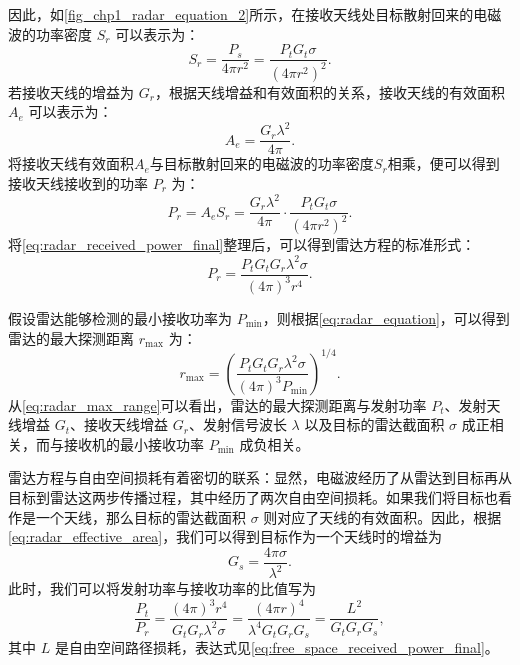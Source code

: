 因此，如\cref{fig_chp1_radar_equation_2}所示，在接收天线处目标散射回来的电磁波的功率密度 $S_r$ 可以表示为：
\begin{equation*}
    S_r = \frac{P_s}{4 \pi r^2} = \frac{P_t G_t \sigma}{(4 \pi r^2)^2}.
    \label{eq:radar_received_power_density}
\end{equation*}
若接收天线的增益为 $G_r$，根据天线增益和有效面积的关系，接收天线的有效面积 $A_e$ 可以表示为：
\begin{equation}
    A_e = \frac{G_r \lambda^2}{4 \pi}.
    \label{eq:radar_effective_area}
\end{equation}
将接收天线有效面积\( A_e \)与目标散射回来的电磁波的功率密度\( S_r \)相乘，便可以得到接收天线接收到的功率 $P_r$ 为：
\begin{equation}
    P_r = A_e S_r  = \frac{G_r \lambda^2}{4 \pi} \cdot \frac{P_t G_t \sigma}{(4 \pi r^2)^2}.
    \label{eq:radar_received_power_final}
\end{equation}
将\cref{eq:radar_received_power_final}整理后，可以得到雷达方程的标准形式：
\begin{equation}
    P_r = \frac{P_t G_t G_r \lambda^2 \sigma}{(4 \pi)^3 r^4}.
    \label{eq:radar_equation}
\end{equation}

假设雷达能够检测的最小接收功率为 $P_{\text{min}}$，则根据\cref{eq:radar_equation}，可以得到雷达的最大探测距离 $r_{\text{max}}$ 为：
\begin{equation}
    r_{\text{max}} = \left( \frac{P_t G_t G_r \lambda^2 \sigma}{(4 \pi)^3 P_{\text{min}}} \right)^{1/4}.
    \label{eq:radar_max_range}
\end{equation}
从\cref{eq:radar_max_range}可以看出，雷达的最大探测距离与发射功率 $P_t$、发射天线增益 $G_t$、接收天线增益 $G_r$、发射信号波长 $\lambda$ 以及目标的雷达截面积 $\sigma$ 成正相关，而与接收机的最小接收功率 $P_{\text{min}}$ 成负相关。

雷达方程与自由空间损耗有着密切的联系：显然，电磁波经历了从雷达到目标再从目标到雷达这两步传播过程，其中经历了两次自由空间损耗。如果我们将目标也看作是一个天线，那么目标的雷达截面积 $\sigma$ 则对应了天线的有效面积。因此，根据\cref{eq:radar_effective_area}，我们可以得到目标作为一个天线时的增益为
\[
    G_s =  \frac{4 \pi \sigma}{\lambda^2}.
\]
此时，我们可以将发射功率与接收功率的比值写为
\begin{equation}
    \frac{P_t}{P_r} = \frac{(4 \pi)^3 r^4}{G_t G_r \lambda^2 \sigma} =\frac{(4 \pi r)^4}{\lambda^4 G_t G_r G_s} = \frac{L^2}{G_t G_r G_s},
    \label{eq:radar_equation_gain}
\end{equation}
其中 $L$ 是自由空间路径损耗，表达式见\cref{eq:free_space_received_power_final}。

